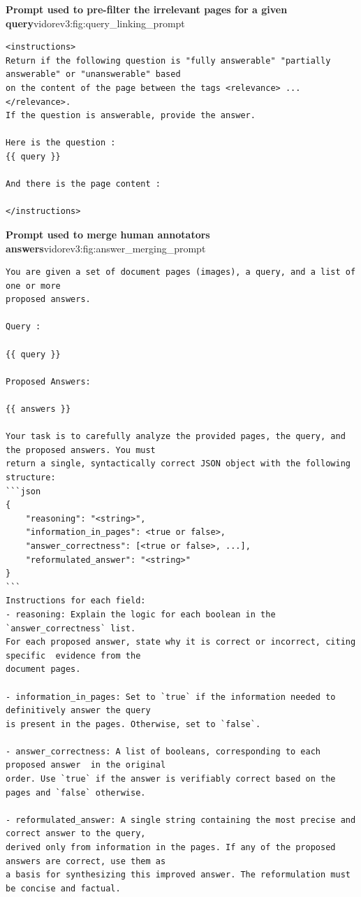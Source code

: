 \begin{promptfigure}{\textbf{Prompt used to pre-filter the irrelevant pages for a given query}}{vidorev3:fig:query_linking_prompt}
\begin{Verbatim}[breaklines=true,breakanywhere=true,fontsize=\scriptsize]
<instructions>
Return if the following question is "fully answerable" "partially answerable" or "unanswerable" based
on the content of the page between the tags <relevance> ... </relevance>. 
If the question is answerable, provide the answer.

Here is the question :
{{ query }}

And there is the page content :

</instructions>
\end{Verbatim}
\end{promptfigure}

\begin{promptfigure}{\textbf{Prompt used to merge human annotators answers}}{vidorev3:fig:answer_merging_prompt}
\begin{Verbatim}[breaklines=true,breakanywhere=true,fontsize=\scriptsize]
You are given a set of document pages (images), a query, and a list of one or more
proposed answers.

Query :

{{ query }}

Proposed Answers:

{{ answers }}

Your task is to carefully analyze the provided pages, the query, and the proposed answers. You must
return a single, syntactically correct JSON object with the following structure:
```json
{
    "reasoning": "<string>",
    "information_in_pages": <true or false>,
    "answer_correctness": [<true or false>, ...],
    "reformulated_answer": "<string>"
}
```
Instructions for each field:
- reasoning: Explain the logic for each boolean in the `answer_correctness` list.
For each proposed answer, state why it is correct or incorrect, citing specific  evidence from the
document pages.

- information_in_pages: Set to `true` if the information needed to definitively answer the query
is present in the pages. Otherwise, set to `false`.

- answer_correctness: A list of booleans, corresponding to each proposed answer  in the original
order. Use `true` if the answer is verifiably correct based on the pages and `false` otherwise.

- reformulated_answer: A single string containing the most precise and correct answer to the query,
derived only from information in the pages. If any of the proposed answers are correct, use them as
a basis for synthesizing this improved answer. The reformulation must be concise and factual.


\end{Verbatim}
\end{promptfigure}
